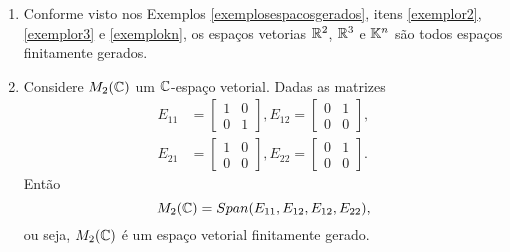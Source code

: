 \begin{exemplos}
    \begin{enumerate}
        \item Conforme visto nos Exemplos \ref{exemplosespacosgerados}, itens \ref{exemplor2}, \ref{exemplor3} e \ref{exemplokn}, os espaços vetorias $\mathbb{R}^2$, $\mathbb{R}^3$ e $\mathbb{K}^n$ são todos espaços finitamente gerados.

        \item Considere $M_2(\mathbb{C})$ um $\mathbb{C}$-espaço vetorial. Dadas as matrizes
        \begin{align*}
            E_{11} &= \begin{bmatrix}1 & 0\\0 & 1\end{bmatrix},
            E_{12} = \begin{bmatrix}0 & 1\\0 &0 \end{bmatrix},\\
            E_{21} &= \begin{bmatrix}1 & 0\\0 & 0\end{bmatrix},
            E_{22} = \begin{bmatrix}0 & 1\\0 & 0\end{bmatrix}.
        \end{align*}
        Então
        \[
            M_2(\mathbb{C}) = Span(E_{11}, E_{12}, E_{12}, E_{22}),
        \]
        ou seja, $M_2(\mathbb{C})$ é um espaço vetorial finitamente gerado.


\end{enumerate}
\end{exemplos}
